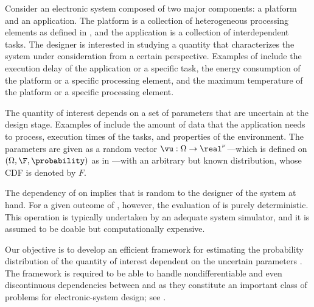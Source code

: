 Consider an electronic system composed of two major components: a platform and
an application. The platform is a collection of heterogeneous processing
elements as defined in , and the application is a collection
of interdependent tasks. The designer is interested in studying a quantity \g
that characterizes the system under consideration from a certain perspective.
Examples of \g include the execution delay of the application or a specific
task, the energy consumption of the platform or a specific processing element,
and the maximum temperature of the platform or a specific processing element.

The quantity of interest \g depends on a set of parameters \vu that are
uncertain at the design stage. Examples of \vu include the amount of data that
the application needs to process, execution times of the tasks, and properties
of the environment. The parameters \vu are given as a random vector $\vu: \Omega
\to \real^\nu$---which is defined on $(\Omega, \F, \probability)$ as in
---with an arbitrary but known distribution, whose
\ac{CDF} is denoted by $F$.

The dependency of \g on \vu implies that \g is random to the designer of the
system at hand. For a given outcome of \vu, however, the evaluation of \g is
purely deterministic. This operation is typically undertaken by an adequate
system simulator, and it is assumed to be doable but computationally expensive.

Our objective is to develop an efficient framework for estimating the
probability distribution of the quantity of interest \g dependent on the
uncertain parameters \vu. The framework is required to be able to handle
nondifferentiable and even discontinuous dependencies between \g and \vu as they
constitute an important class of problems for electronic-system design; see
.
